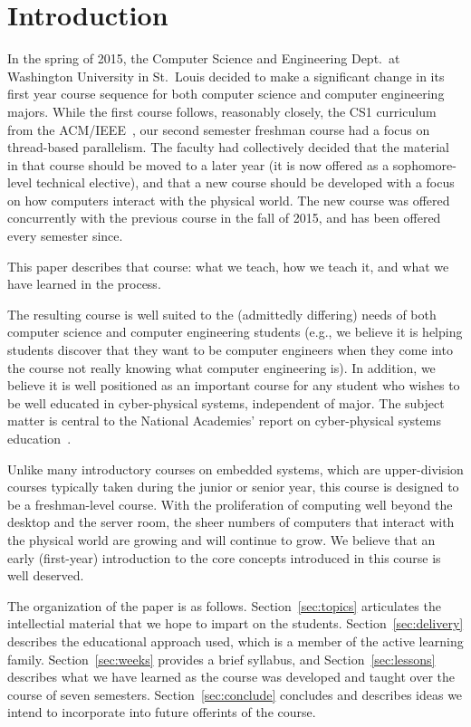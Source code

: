 \section{Introduction}
\label{sec:intro}

In the spring of 2015, the Computer Science and Engineering Dept.~at
Washington University in St.~Louis decided to make a significant change
in its first year course sequence for both computer science and
computer engineering majors.  While the first course follows, reasonably
closely, the CS1 curriculum from the ACM/IEEE~\cite{cs13}, our second semester
freshman course had a focus on thread-based parallelism.  The faculty
had collectively decided that the material in that course should be moved
to a later year (it is now offered as a sophomore-level technical elective),
and that a new course should be developed with a focus on how computers
interact with the physical world.
The new course was offered concurrently with the previous course in the
fall of 2015, and has been offered every semester since.

This paper describes that course: what we teach, how we teach it, and
what we have learned in the process.

The resulting course is well suited to the (admittedly differing) needs of
both computer science and computer
engineering students (e.g., we believe it is helping students discover
that they want to be computer engineers when they come into the course
not really knowing what computer engineering is).
In addition, we believe it is well positioned as an important course for
any student who wishes to be well educated in cyber-physical systems,
independent of major.
The subject matter is central to the National Academies' report on
cyber-physical systems education~\cite{nasem16}.

Unlike many introductory courses on embedded systems, which are upper-division
courses typically taken during the junior or senior year, this course is
designed to be a freshman-level course. With the proliferation of
computing well beyond the desktop and the server room, the sheer numbers
of computers that interact with the physical world are growing and
will continue to grow.
We believe that an early (first-year) introduction to the core concepts
introduced in this course is well deserved.

The organization of the paper is as follows.  Section~\ref{sec:topics}
articulates the intellectial material that we hope to impart on the
students.  
Section~\ref{sec:delivery} describes the educational approach used,
which is a member of the active learning family.
Section~\ref{sec:weeks} provides a brief syllabus, and
Section~\ref{sec:lessons} describes what we have learned as the course
was developed and taught over the course of seven semesters.
Section~\ref{sec:conclude} concludes and describes ideas we intend
to incorporate into future offerints of the course.
